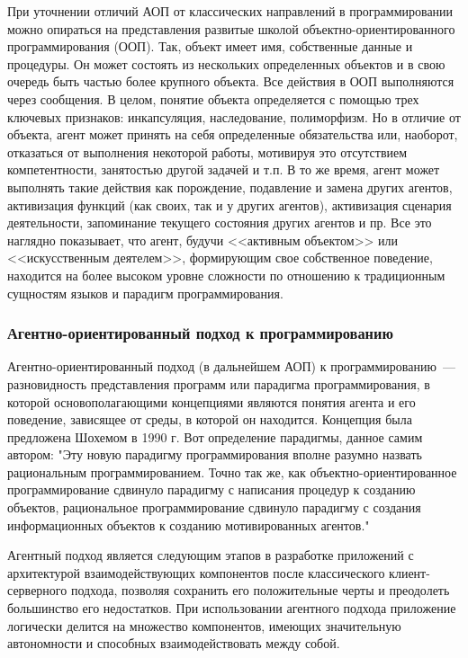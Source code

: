 При уточнении отличий АОП от классических направлений в программировании можно опираться на представления развитые школой объектно-ориентированного программирования (ООП). Так, объект имеет имя, собственные данные и процедуры. Он может состоять из нескольких определенных объектов и в свою очередь быть частью более крупного объекта. Все действия в ООП выполняются через сообщения. В целом, понятие объекта определяется с помощью трех ключевых признаков: инкапсуляция, наследование, полиморфизм. Но в отличие от объекта, агент может принять на себя определенные обязательства или, наоборот, отказаться от выполнения некоторой работы, мотивируя это отсутствием компетентности, занятостью другой задачей и т.п. В то же время, агент может выполнять такие действия как порождение, подавление и замена других агентов, активизация функций (как своих, так и у других агентов), активизация сценария деятельности, запоминание текущего состояния других агентов и пр. Все это наглядно показывает, что агент, будучи <<активным объектом>> или <<искусственным деятелем>>, формирующим свое собственное поведение, находится на более высоком уровне сложности по отношению к традиционным сущностям языков и парадигм программирования.

\subsubsection{Агентно-ориентированный подход к программированию}
Агентно-ориентированный подход (в дальнейшем АОП) к программированию~---  разновидность представления программ или парадигма программирования, в которой основополагающими концепциями являются понятия агента и его поведение, зависящее от среды, в которой он находится. Концепция была предложена Шохемом в 1990 г. Вот определение парадигмы, данное самим автором:
"Эту новую парадигму программирования вполне разумно назвать рациональным программированием. Точно так же, как объектно-ориентированное программирование сдвинуло парадигму с написания процедур к созданию объектов, рациональное программирование сдвинуло парадигму с создания информационных объектов к созданию мотивированных агентов."

Агентный подход является следующим этапов в разработке приложений с архитектурой взаимодействующих компонентов после классического клиент-серверного подхода, позволяя сохранить его положительные черты и преодолеть большинство его недостатков. При использовании агентного подхода приложение логически делится на множество компонентов, имеющих значительную автономности и способных взаимодействовать между собой.

